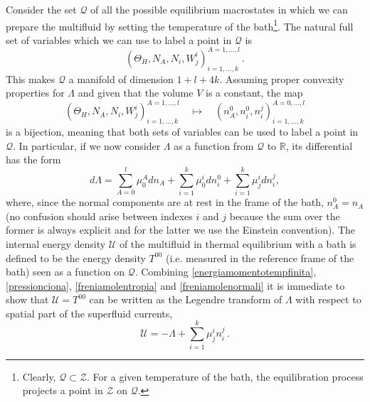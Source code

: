 \documentclass[usenatbib]{mnras}
\begin{document}
Consider the set $\mathcal{Q}$ of all the possible equilibrium macrostates in which we can prepare the multifluid by setting the temperature of the bath\footnote{
Clearly, $\mathcal{Q}  \subset \mathcal{Z}$. For a given  temperature of the bath, the equilibration process projects a point in $\mathcal{Z}$ on $\mathcal{Q}$.
}. 
The natural full set of variables which we can use to label a point in $\mathcal{Q}$ is
%
\begin{equation}
(\Theta_H, N_A,N_i, W^i_j)^{A=1,...,l}_{i=1,...,k} \, .
\end{equation}
%
This makes $\mathcal{Q}$ a manifold of dimension $1+l+4k$. 
Assuming proper convexity properties for $\Lambda$ and given that the volume $V$ is a constant, the map
%
\begin{equation}
(\Theta_H, N_A,N_i, W^i_j)^{A=1,...,l}_{i=1,...,k} \quad \longmapsto \quad (n_A^0,n_i^0,n_i^j)^{A=0,...,l}_{i=1,...,k}
\end{equation}
%
is a bijection, meaning that both sets of variables can be used to label a point in $\mathcal{Q}$. In particular, if we now consider $\Lambda$ as a function from $\mathcal{Q}$ to $\mathbb{R}$, its differential has the form
%
\begin{equation}
d\Lambda = \sum_{A=0}^l \mu^A_0 dn_A + \sum_{i=1}^k \mu^i_0 dn_i^0 + \sum_{i=1}^k \mu^i_j dn_i^j,
\end{equation}
%
where, since the normal components are at rest in the frame of the bath, $n_A^0 =n_A$  (no confusion should arise between indexes $i$ and $j$ because the sum over the former is always explicit and for the latter we use the Einstein convention). The internal energy density $\mathcal{U}$ of the multifluid in thermal equilibrium with a bath is defined to be the energy density $T^{00}$ (i.e. measured in the reference frame of the bath) seen as a function on $\mathcal{Q}$. Combining \eqref{energiamomentotempfinita}, \eqref{pressionciona}, \eqref{freniamolentropia} and \eqref{freniamolenormali} it is immediate to show that  $\mathcal{U}=T^{00}$ can be written as the Legendre transform of $\Lambda$ with respect to spatial part of the superfluid currents,
%
\begin{equation}\label{dubbidubadubbidubbiduba}
\mathcal{U} = -\Lambda + \sum_{i=1}^k \mu^i_j n^j_i \, .
\end{equation}
\end{document}

